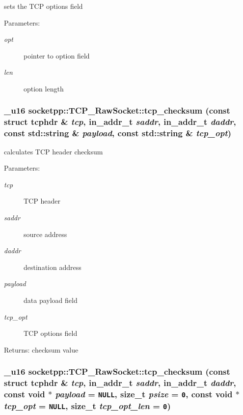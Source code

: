 sets the TCP options field 

\begin{Desc}
\item[Parameters:]
\begin{description}
\item[{\em opt}]pointer to option field \item[{\em len}]option length \end{description}
\end{Desc}
\hypertarget{classsocketpp_1_1TCP__RawSocket_237a9811c114b7d38e41e9d65265b4cd}{
\subsubsection[{tcp\_\-checksum}]{\setlength{\rightskip}{0pt plus 5cm}\_\-u16 socketpp::TCP\_\-RawSocket::tcp\_\-checksum (const struct tcphdr \& {\em tcp}, \/  in\_\-addr\_\-t {\em saddr}, \/  in\_\-addr\_\-t {\em daddr}, \/  const std::string \& {\em payload}, \/  const std::string \& {\em tcp\_\-opt})}}
\label{classsocketpp_1_1TCP__RawSocket_237a9811c114b7d38e41e9d65265b4cd}


calculates TCP header checksum 

\begin{Desc}
\item[Parameters:]
\begin{description}
\item[{\em tcp}]TCP header \item[{\em saddr}]source address \item[{\em daddr}]destination address \item[{\em payload}]data payload field \item[{\em tcp\_\-opt}]TCP options field \end{description}
\end{Desc}
\begin{Desc}
\item[Returns:]checksum value \end{Desc}
\hypertarget{classsocketpp_1_1TCP__RawSocket_91cf9d3aaf57d50ba1e26c8621083728}{
\subsubsection[{tcp\_\-checksum}]{\setlength{\rightskip}{0pt plus 5cm}\_\-u16 socketpp::TCP\_\-RawSocket::tcp\_\-checksum (const struct tcphdr \& {\em tcp}, \/  in\_\-addr\_\-t {\em saddr}, \/  in\_\-addr\_\-t {\em daddr}, \/  const void $\ast$ {\em payload} = {\tt NULL}, \/  size\_\-t {\em psize} = {\tt 0}, \/  const void $\ast$ {\em tcp\_\-opt} = {\tt NULL}, \/  size\_\-t {\em tcp\_\-opt\_\-len} = {\tt 0})}}
\label{classsocketpp_1_1TCP__RawSocket_91cf9d3aaf57d50ba1e26c8621083728}


